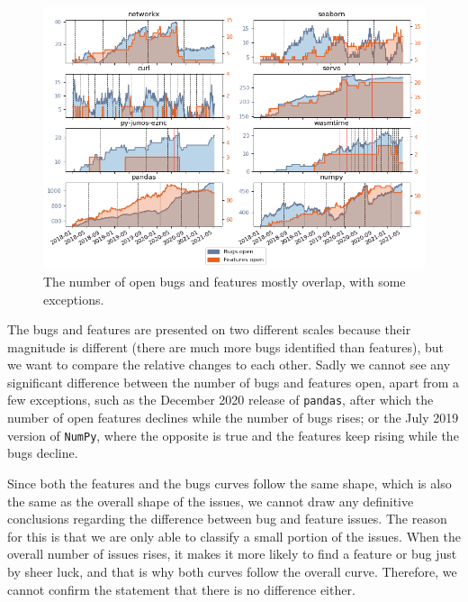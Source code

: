 \begin{figure}[!htbp]
    \centering
    \includegraphics[width=\textwidth]{figures/qualitative/issues_closed_created/features_and_bugs.png}
    \caption{The number of open bugs and features mostly overlap, with some exceptions.}
    \label{fig:open_bugs_features}
\end{figure}

The bugs and features are presented on two different scales because their magnitude is different (there are much more bugs identified than features), but we want to compare the relative changes to each other. Sadly we cannot see any significant difference between the number of bugs and features open, apart from a few exceptions, such as the December 2020 release of \texttt{pandas}, after which the number of open features declines while the number of bugs rises; or the July 2019 version of \texttt{NumPy}, where the opposite is true and the features keep rising while the bugs decline.

Since both the features and the bugs curves follow the same shape, which is also the same as the overall shape of the issues, we cannot draw any definitive conclusions regarding the difference between bug and feature issues. The reason for this is that we are only able to classify a small portion of the issues. When the overall number of issues rises, it makes it more likely to find a feature or bug just by sheer luck, and that is why both curves follow the overall curve. Therefore, we cannot confirm the statement that there is no difference either.

